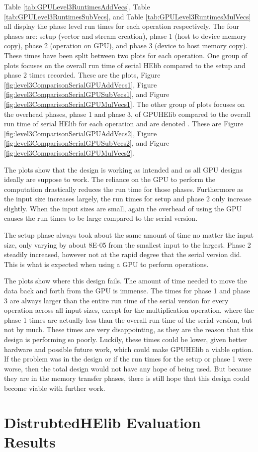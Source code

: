 Table \ref{tab:GPULevel3RuntimesAddVecs}, Table \ref{tab:GPULevel3RuntimesSubVecs}, and Table \ref{tab:GPULevel3RuntimesMulVecs} all display the phase level run times for each operation respectively. The four phases are: setup (vector and stream creation), phase 1 (host to device memory copy), phase 2 (operation on GPU), and phase 3 (device to host memory copy). These times have been split between two plots for each operation. One group of plots focuses on the overall run time of serial HElib compared to the setup and phase 2 times recorded. These are the  plots, Figure \ref{fig:level3ComparisonSerialGPUAddVecs1}, Figure \ref{fig:level3ComparisonSerialGPUSubVecs1}, and Figure \ref{fig:level3ComparisonSerialGPUMulVecs1}. The other group of plots focuses on the overhead phases, phase 1 and phase 3, of GPUHElib compared to the overall run time of serial HElib for each operation and are denoted . These are Figure \ref{fig:level3ComparisonSerialGPUAddVecs2}, Figure \ref{fig:level3ComparisonSerialGPUSubVecs2}, and Figure \ref{fig:level3ComparisonSerialGPUMulVecs2}.

The  plots show that the design is working as intended and as all GPU designs ideally are suppose to work. The reliance on the GPU to perform the computation drastically reduces the run time for those phases. Furthermore as the input size increases largely, the run times for setup and phase 2 only increase slightly. When the input sizes are small, again the overhead of using the GPU causes the run times to be large compared to the serial version. 

The setup phase always took about the same amount of time no matter the input size, only varying by about 8E-05 from the smallest input to the largest. Phase 2 steadily increased, however not at the rapid degree that the serial version did. This is what is expected when using a GPU to perform operations.

The  plots show where this design fails. The amount of time needed to move the data back and forth from the GPU is immense. The times for phase 1 and phase 3 are always larger than the entire run time of the serial version for every operation across all input sizes, except for the multiplication operation, where the phase 1 times are actually less than the overall run time of the serial version, but not by much. These times are very disappointing, as they are the reason that this design is performing so poorly. Luckily, these times could be lower, given better hardware and possible future work, which could make GPUHElib a viable option. If the problem was in the design or if the run times for the setup or phase 1 were worse, then the total design would not have any hope of being used. But because they are in the memory transfer phases, there is still hope that this design could become viable with further work.

\section{DistrubtedHElib Evaluation Results} \label{sec:DistributedHElibEvaluationResults}